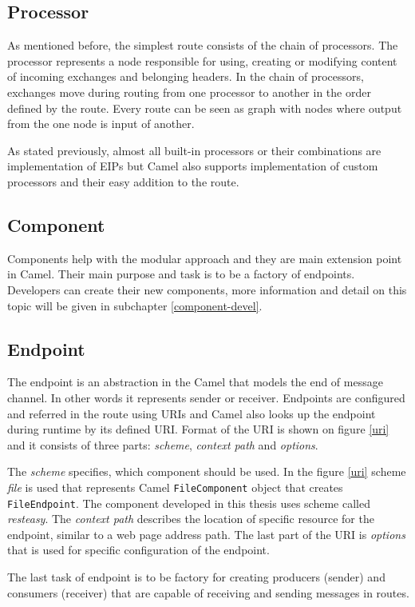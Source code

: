 \documentclass[12pt,final,oneside]{fithesis2}
\begin{document}
\subsection*{Processor}
As mentioned before, the simplest route consists of the chain of processors. The processor represents a node responsible for using, creating or modifying content of incoming exchanges and belonging headers. In the chain of processors, exchanges move during routing from one processor to another in the order defined by the route. Every route can be seen as graph with nodes where output from the one node is input of another.

As stated previously, almost all built-in processors or their combinations are implementation of EIPs but Camel also supports implementation of custom processors and their easy addition to the route.

\subsection*{Component}
Components help with the modular approach and they are main extension point in Camel. Their main purpose and task is to be a factory of endpoints. Developers can create their new components, more information and detail on this topic will be given in subchapter \ref{component-devel}. 

\subsection*{Endpoint}
The endpoint is an abstraction in the Camel that models the end of message channel. In other words it represents sender or receiver. Endpoints are configured and referred in the route using URIs and Camel also looks up the endpoint during runtime by its defined URI. Format of the URI is shown on figure \ref{uri} and it consists of three parts: \textit{scheme}, \textit{context path} and \textit{options}. 

The \textit{scheme} specifies, which component should be used. In the figure \ref{uri} scheme \textit{file} is used that represents Camel \texttt{FileComponent} object that creates \texttt{FileEndpoint}. The component developed in this thesis uses scheme called \textit{resteasy}. The \textit{context path} describes the location of specific resource for the endpoint, similar to a web page address path. The last part of the URI is \textit{options} that is used for specific configuration of the endpoint.

The last task of endpoint is to be factory for creating producers (sender) and consumers (receiver) that are capable of receiving and sending messages in routes.
\end{document}
